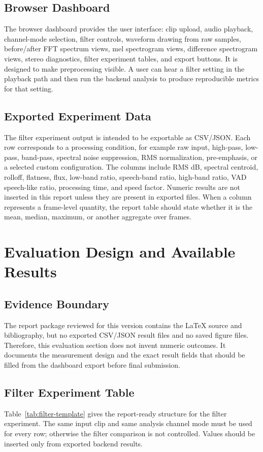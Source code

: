 ﻿\documentclass[11pt,a4paper]{article}
\begin{document}
\subsection{Browser Dashboard}
The browser dashboard provides the user interface: clip upload, audio playback, channel-mode selection, filter controls, waveform drawing from raw samples, before/after FFT spectrum views, mel spectrogram views, difference spectrogram views, stereo diagnostics, filter experiment tables, and export buttons. It is designed to make preprocessing visible. A user can hear a filter setting in the playback path and then run the backend analysis to produce reproducible metrics for that setting.

\subsection{Exported Experiment Data}
The filter experiment output is intended to be exportable as CSV/JSON. Each row corresponds to a processing condition, for example raw input, high-pass, low-pass, band-pass, spectral noise suppression, RMS normalization, pre-emphasis, or a selected custom configuration. The columns include RMS dB, spectral centroid, rolloff, flatness, flux, low-band ratio, speech-band ratio, high-band ratio, VAD speech-like ratio, processing time, and speed factor. Numeric results are not inserted in this report unless they are present in exported files. When a column represents a frame-level quantity, the report table should state whether it is the mean, median, maximum, or another aggregate over frames.

\section{Evaluation Design and Available Results}
\subsection{Evidence Boundary}
The report package reviewed for this version contains the LaTeX source and bibliography, but no exported CSV/JSON result files and no saved figure files. Therefore, this evaluation section does not invent numeric outcomes. It documents the measurement design and the exact result fields that should be filled from the dashboard export before final submission.

\subsection{Filter Experiment Table}
Table~\ref{tab:filter-template} gives the report-ready structure for the filter experiment. The same input clip and same analysis channel mode must be used for every row; otherwise the filter comparison is not controlled. Values should be inserted only from exported backend results.
\end{document}
